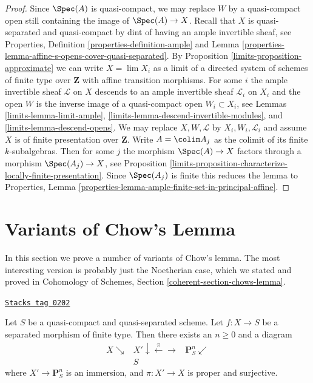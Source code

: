 \begin{proof}

Since $\Spec(A)$ is quasi-compact, we may replace $W$ by a quasi-compact
open still containing the image of $\Spec(A) \to X$.
Recall that $X$ is quasi-separated and quasi-compact by dint
of having an ample invertible sheaf, see
Properties, Definition \ref{properties-definition-ample} and
Lemma \ref{properties-lemma-affine-s-opens-cover-quasi-separated}.
By Proposition \ref{limits-proposition-approximate} we can
write $X = \lim X_i$ as a limit of a directed system
of schemes of finite type over $\mathbf{Z}$
with affine transition morphisms.
For some $i$ the ample invertible sheaf $\mathcal{L}$ on $X$
descends to an ample invertible sheaf $\mathcal{L}_i$ on $X_i$
and the open $W$ is the inverse image of a quasi-compact
open $W_i \subset X_i$, see
Lemmas \ref{limits-lemma-limit-ample}, \ref{limits-lemma-descend-invertible-modules}, and
\ref{limits-lemma-descend-opens}.
We may replace $X, W, \mathcal{L}$ by $X_i, W_i, \mathcal{L}_i$
and assume $X$ is of finite presentation over $\mathbf{Z}$.
Write $A = \colim A_j$ as the colimit of its finite $k$-subalgebras.
Then for some $j$ the morphism $\Spec(A) \to X$ factors through
a morphism $\Spec(A_j) \to X$, see
Proposition \ref{limits-proposition-characterize-locally-finite-presentation}.
Since $\Spec(A_j)$ is finite this reduces the lemma to
Properties, Lemma \ref{properties-lemma-ample-finite-set-in-principal-affine}.
\end{proof}

\section{Variants of Chow's Lemma}
\label{limits-section-chows-lemma}
In this section we prove a number of variants of Chow's lemma.
The most interesting version is probably just the Noetherian
case, which we stated and proved in
Cohomology of Schemes, Section \ref{coherent-section-chows-lemma}.

\begin{lemma}
\label{limits-lemma-chow-finite-type}
\href{https://stacks.math.columbia.edu/tag/0202}{\texttt{Stacks tag 0202}}

Let $S$ be a quasi-compact and quasi-separated scheme.
Let $f : X \to S$ be a separated morphism of finite type.
Then there exists an $n \geq 0$ and a diagram
$$
\begin{array}{ccc}X \searrow & X' \downarrow\overset{\pi}{\longleftarrow}\longrightarrow & \mathbf{P}^n_S \swarrow \\  & S & \end{array}
$$
where $X' \to \mathbf{P}^n_S$ is an immersion, and
$\pi : X' \to X$ is proper and surjective.
\end{lemma}

